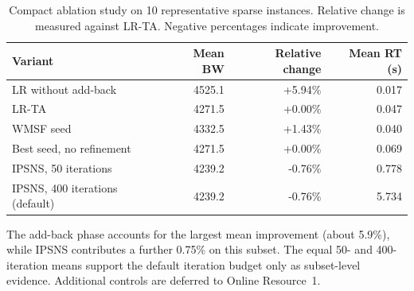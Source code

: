 \begin{table}[t]
\centering
\caption{Compact ablation study on 10 representative sparse instances. Relative change is measured against LR-TA. Negative percentages indicate improvement.}
\label{tab:ablation}
\begin{tabular}{lrrr}
\toprule
Variant & Mean BW & Relative change & Mean RT (s) \\
\midrule
LR without add-back & 4525.1 & +5.94\% & 0.017 \\
LR-TA & 4271.5 & +0.00\% & 0.047 \\
WMSF seed & 4332.5 & +1.43\% & 0.040 \\
Best seed, no refinement & 4271.5 & +0.00\% & 0.069 \\
IPSNS, 50 iterations & 4239.2 & -0.76\% & 0.778 \\
IPSNS, 400 iterations (default) & 4239.2 & -0.76\% & 5.734 \\
\bottomrule
\end{tabular}
\par\vspace{2pt}\parbox{0.94\linewidth}{\footnotesize The add-back phase accounts for the largest mean improvement (about 5.9\%), while IPSNS contributes a further 0.75\% on this subset. The equal 50- and 400-iteration means support the default iteration budget only as subset-level evidence. Additional controls are deferred to Online Resource~1.}
\end{table}
